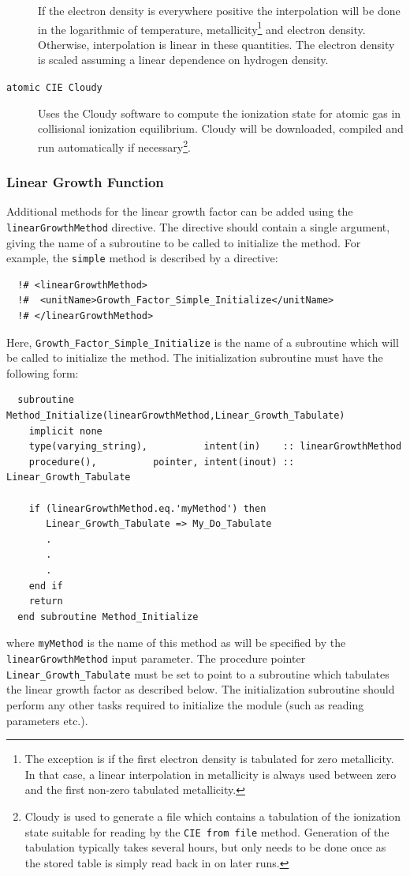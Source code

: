 \begin{description}
\begin{description}
 \end{description}
 If the electron density is everywhere positive the interpolation will be done in the logarithmic of temperature, metallicity\footnote{The exception is if the first electron density is tabulated for zero metallicity. In that case, a linear interpolation in metallicity is always used between zero and the first non-zero tabulated metallicity.} and electron density. Otherwise, interpolation is linear in these quantities. The electron density is scaled assuming a linear dependence on hydrogen density.
 \item [{\tt atomic CIE Cloudy}] Uses the {\sc Cloudy} software to compute the ionization state for atomic gas in collisional ionization equilibrium. {\sc Cloudy} will be downloaded, compiled and run automatically if necessary\footnote{{\sc Cloudy} is used to generate a file which contains a tabulation of the ionization state suitable for reading by the {\tt CIE from file} method. Generation of the tabulation typically takes several hours, but only needs to be done once as the stored table is simply read back in on later runs.}.
\end{description}

\subsubsection{Linear Growth Function}

Additional methods for the linear growth factor can be added using the {\tt linearGrowthMethod} directive. The directive should contain a single argument, giving the name of a subroutine to be called to initialize the method. For example, the {\tt simple} method is described by a directive:
\begin{verbatim}
  !# <linearGrowthMethod>
  !#  <unitName>Growth_Factor_Simple_Initialize</unitName>
  !# </linearGrowthMethod>
\end{verbatim}
Here, {\tt Growth\_Factor\_Simple\_Initialize} is the name of a subroutine which will be called to initialize the method. The initialization subroutine must have the following form:
\begin{verbatim}
  subroutine Method_Initialize(linearGrowthMethod,Linear_Growth_Tabulate)
    implicit none
    type(varying_string),          intent(in)    :: linearGrowthMethod
    procedure(),          pointer, intent(inout) :: Linear_Growth_Tabulate
    
    if (linearGrowthMethod.eq.'myMethod') then
       Linear_Growth_Tabulate => My_Do_Tabulate
       .
       .
       .
    end if
    return
  end subroutine Method_Initialize
\end{verbatim}
where {\tt myMethod} is the name of this method as will be specified by the {\tt linearGrowthMethod} input parameter. The procedure pointer {\tt Linear\_Growth\_Tabulate} must be set to point to a subroutine which tabulates the linear growth factor as described below. The initialization subroutine should perform any other tasks required to initialize the module (such as reading parameters etc.).

